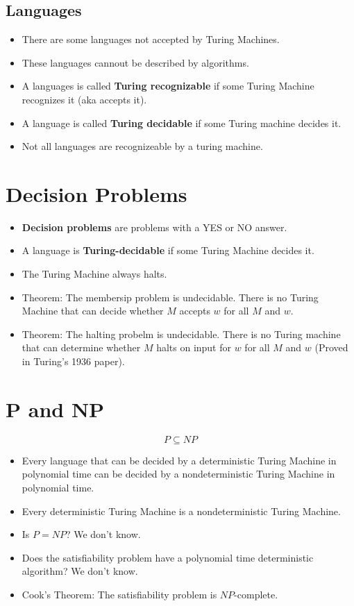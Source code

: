 \documentclass[letter]{article}
\begin{document}
\begin{multicols}{2}
  \subsection{Languages}\noindent
  \begin{itemize}[noitemsep]
    \item There are some languages not accepted by Turing Machines.
    \item These languages cannout be described by algorithms.
    \item A languages is called \textbf{Turing recognizable} if some Turing
          Machine recognizes it (aka accepts it).
    \item A language is called \textbf{Turing decidable} if some Turing machine
          decides it.
    \item Not all languages are recognizeable by a turing machine.
  \end{itemize}

  \section{Decision Problems}\noindent
  \begin{itemize}[noitemsep]
    \item \textbf{Decision problems} are problems with a YES or NO answer.
    \item A language is \textbf{Turing-decidable} if some Turing Machine decides
          it.
    \item The Turing Machine always halts.
    \item Theorem: The membersip problem is undecidable. There is no Turing
          Machine that can decide whether $M$ accepts $w$ for all $M$ and $w$.
    \item Theorem: The halting probelm is undecidable. There is no Turing
          machine that can determine whether $M$ halts on input for $w$ for all
          $M$ and $w$ (Proved in Turing's 1936 paper).
  \end{itemize}

  \section{P and NP}\noindent
  $$P \subseteq NP$$
  \begin{itemize}[noitemsep]
    \item Every language that can be decided by a deterministic Turing
          Machine in polynomial time can be decided by a nondeterministic
          Turing Machine in polynomial time.
    \item Every deterministic Turing Machine is a nondeterministic Turing
          Machine.
    \item Is $P = NP$? We don't know.
    \item Does the satisfiability problem have a polynomial time deterministic
          algorithm? We don't know.
    \item Cook's Theorem: The satisfiability problem is $NP$-complete.
  \end{itemize}

\end{multicols}
\end{document}
